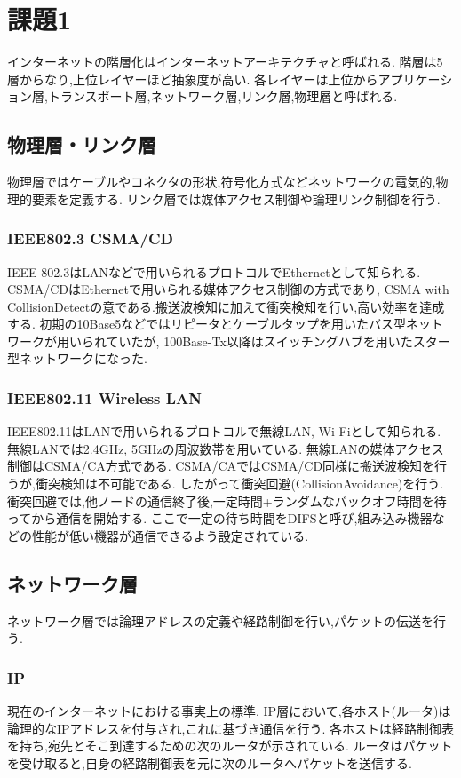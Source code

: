 \section{課題1}
インターネットの階層化はインターネットアーキテクチャと呼ばれる.
階層は5層からなり,上位レイヤーほど抽象度が高い.
各レイヤーは上位からアプリケーション層,トランスポート層,ネットワーク層,リンク層,物理層と呼ばれる.
\subsection{物理層・リンク層}
物理層ではケーブルやコネクタの形状,符号化方式などネットワークの電気的,物理的要素を定義する.
リンク層では媒体アクセス制御や論理リンク制御を行う.
\subsubsection{IEEE802.3 CSMA/CD}
IEEE 802.3はLANなどで用いられるプロトコルでEthernetとして知られる.
CSMA/CDはEthernetで用いられる媒体アクセス制御の方式であり,
CSMA with CollisionDetectの意である.搬送波検知に加えて衝突検知を行い,高い効率を達成する.
初期の10Base5などではリピータとケーブルタップを用いたバス型ネットワークが用いられていたが,
100Base-Tx以降はスイッチングハブを用いたスター型ネットワークになった.
\subsubsection{IEEE802.11 Wireless LAN}
IEEE802.11はLANで用いられるプロトコルで無線LAN, Wi-Fiとして知られる.
無線LANでは2.4GHz, 5GHzの周波数帯を用いている.
無線LANの媒体アクセス制御はCSMA/CA方式である.
CSMA/CAではCSMA/CD同様に搬送波検知を行うが,衝突検知は不可能である.
したがって衝突回避(CollisionAvoidance)を行う.
衝突回避では,他ノードの通信終了後,一定時間+ランダムなバックオフ時間を待ってから通信を開始する.
ここで一定の待ち時間をDIFSと呼び,組み込み機器などの性能が低い機器が通信できるよう設定されている\cite{sunahara}.
\subsection{ネットワーク層}
ネットワーク層では論理アドレスの定義や経路制御を行い,パケットの伝送を行う.
\subsubsection{IP}
現在のインターネットにおける事実上の標準.
IP層において,各ホスト(ルータ)は論理的なIPアドレスを付与され,これに基づき通信を行う.
各ホストは経路制御表を持ち,宛先とそこ到達するための次のルータが示されている.
ルータはパケットを受け取ると,自身の経路制御表を元に次のルータへパケットを送信する.
